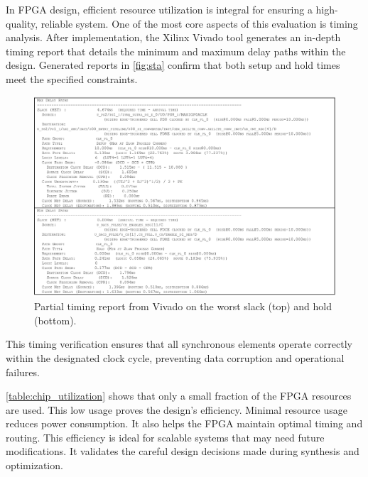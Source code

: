 In FPGA design, efficient resource utilization is integral for ensuring a high-quality, reliable system. One of the most core aspects of this evaluation is timing analysis. After implementation, the Xilinx Vivado tool generates an in-depth timing report that details the minimum and maximum delay paths within the design. Generated reports in \autoref{fig:sta} confirm that both setup and hold times meet the specified constraints.
\begin{figure}[ht]
    \centering
    \includegraphics[width=1\linewidth]{figures/timimg_report.png}
    \caption{Partial timing report from Vivado on the worst slack (top) and hold (bottom).}
    \label{fig:sta}
\end{figure}
This timing verification ensures that all synchronous elements operate correctly within the designated clock cycle, preventing data corruption and operational failures. 

\autoref{table:chip_utilization} shows that only a small fraction of the FPGA resources are used. This low usage proves the design's efficiency. Minimal resource usage reduces power consumption. It also helps the FPGA maintain optimal timing and routing. This efficiency is ideal for scalable systems that may need future modifications. It validates the careful design decisions made during synthesis and optimization.

